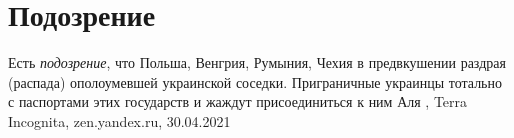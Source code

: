  
 
 
 
 
\chapter{Подозрение}
\label{sec:slova.podozrenie}

Есть \emph{подозрение}, что Польша, Венгрия, Румыния, Чехия в предвкушении
раздрая (распада) ополоумевшей украинской соседки. Приграничные украинцы
тотально с паспортами этих государств и жаждут присоединиться к ним
Аля
, 
Terra Incognita, zen.yandex.ru, 30.04.2021

